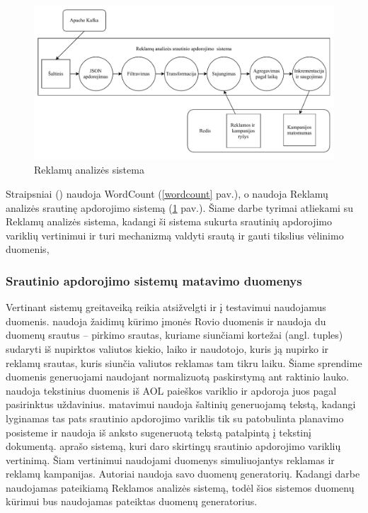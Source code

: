 \documentclass{VUMIFPSbakalaurinis}
\begin{document}
\begin{figure}[H]
    \includegraphics[width=15cm]{img/yahoo.pdf}
    \caption{Reklamų analizės sistema \cite{Chintapalli2016Benchmarking}}
    \label{yahoo}
\end{figure} 

Straipsniai (\cite{Qian2016Benchmarking, huang2010hibench, dhalion}) naudoja WordCount (\ref{wordcount} pav.), o \cite{Chintapalli2016Benchmarking, vaquero2018autotuning} naudoja Reklamų analizės srautinę apdorojimo sistemą (\ref{yahoo} pav.). Šiame darbe tyrimai atliekami su Reklamų analizės sistema, kadangi ši sistema sukurta srautinių apdorojimo variklių vertinimui ir turi    
mechanizmą valdyti srautą ir gauti tikslius vėlinimo duomenis,

\subsubsection{Srautinio apdorojimo sistemų matavimo duomenys}

Vertinant sistemų greitaveiką reikia atsižvelgti ir į testavimui naudojamus duomenis. \cite{Karimov2018BenchmarkingDS} naudoja žaidimų kūrimo įmonės Rovio duomenis ir naudoja du duomenų srautus – pirkimo srautas, kuriame siunčiami kortežai (angl. tuples) sudaryti iš nupirktos valiutos kiekio, laiko ir naudotojo, kuris ją nupirko ir reklamų srautas, kuris siunčia valiutos reklamas tam tikru laiku. Šiame sprendime duomenis generuojami naudojant normalizuotą paskirstymą ant raktinio lauko. \cite{Qian2016Benchmarking} naudoja tekstinius duomenis iš AOL paieškos variklio ir apdoroja juos pagal pasirinktus uždavinius. \cite{zhang2020heron} matavimui naudoja šaltinių generuojamą tekstą, kadangi lyginamas tas pats srautinio apdorojimo variklis tik su patobulinta planavimo posisteme ir naudoja iš anksto sugeneruotą tekstą patalpintą į tekstinį dokumentą. \cite{Chintapalli2016Benchmarking} aprašo sistemą, kuri daro skirtingų srautinio apdorojimo variklių vertinimą. Šiam vertinimui naudojami duomenys simuliuojantys reklamas ir reklamų kampanijas. Autoriai naudoja savo duomenų generatorių. 
Kadangi darbe naudojamas \cite{Chintapalli2016Benchmarking} pateikiamą Reklamos analizės sistemą, todėl šios sistemos duomenų kūrimui bus naudojamas pateiktas duomenų generatorius.
\end{document}
